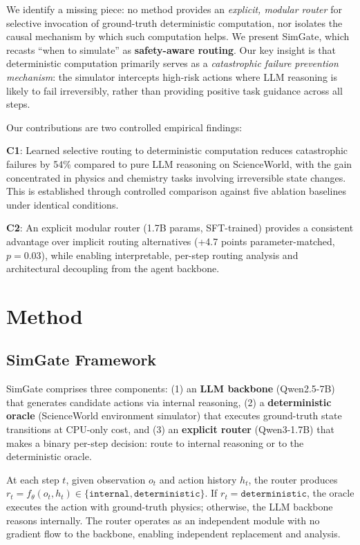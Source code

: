 \documentclass[11pt,a4paper]{article}
\begin{document}
We identify a missing piece: no method provides an \emph{explicit, modular router} for selective invocation of ground-truth deterministic computation, nor isolates the causal mechanism by which such computation helps. We present SimGate, which recasts ``when to simulate'' as \textbf{safety-aware routing}. Our key insight is that deterministic computation primarily serves as a \emph{catastrophic failure prevention mechanism}: the simulator intercepts high-risk actions where LLM reasoning is likely to fail irreversibly, rather than providing positive task guidance across all steps.

Our contributions are two controlled empirical findings:

\noindent\textbf{C1}: Learned selective routing to deterministic computation reduces catastrophic failures by 54\% compared to pure LLM reasoning on ScienceWorld, with the gain concentrated in physics and chemistry tasks involving irreversible state changes. This is established through controlled comparison against five ablation baselines under identical conditions.

\noindent\textbf{C2}: An explicit modular router (1.7B params, SFT-trained) provides a consistent advantage over implicit routing alternatives (+4.7 points parameter-matched, $p{=}0.03$), while enabling interpretable, per-step routing analysis and architectural decoupling from the agent backbone.

\section{Method}

\subsection{SimGate Framework}

SimGate comprises three components: (1) an \textbf{LLM backbone} (Qwen2.5-7B) that generates candidate actions via internal reasoning, (2) a \textbf{deterministic oracle} (ScienceWorld environment simulator) that executes ground-truth state transitions at CPU-only cost, and (3) an \textbf{explicit router} (Qwen3-1.7B) that makes a binary per-step decision: route to internal reasoning or to the deterministic oracle.

At each step $t$, given observation $o_t$ and action history $h_t$, the router produces $r_t = f_\theta(o_t, h_t) \in \{\texttt{internal}, \texttt{deterministic}\}$. If $r_t = \texttt{deterministic}$, the oracle executes the action with ground-truth physics; otherwise, the LLM backbone reasons internally. The router operates as an independent module with no gradient flow to the backbone, enabling independent replacement and analysis.
\end{document}
